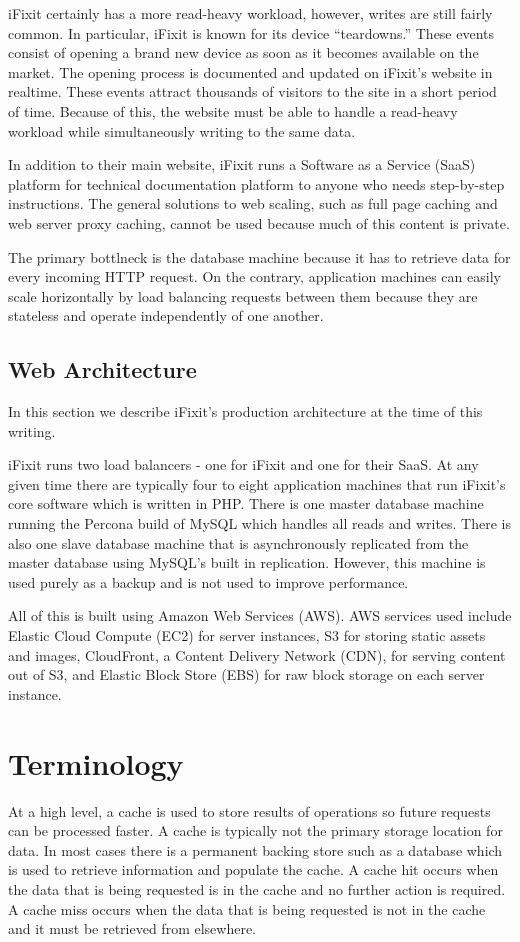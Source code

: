\documentclass[12pt]{ucthesis}
\begin{document}
iFixit certainly has a more read-heavy workload, however, writes are still fairly common.
In particular, iFixit is known for its device ``teardowns.''
These events consist of opening a brand new device as soon as it becomes available on the market.
The opening process is documented and updated on iFixit's website in realtime.
These events attract thousands of visitors to the site in a short period of time.
Because of this, the website must be able to handle a read-heavy workload while simultaneously writing to the same data.

In addition to their main website, iFixit runs a Software as a Service (SaaS) platform for technical documentation platform to anyone who needs step-by-step instructions.
The general solutions to web scaling, such as full page caching and web server proxy caching, cannot be used because much of this content is private.

The primary bottlneck is the database machine because it has to retrieve data for every incoming HTTP request.
On the contrary, application machines can easily scale horizontally by load balancing requests between them because they are stateless and operate independently of one another.

\subsection{Web Architecture}
In this section we describe iFixit's production architecture at the time of this writing.

iFixit runs two load balancers - one for iFixit and one for their SaaS.
At any given time there are typically four to eight application machines that run iFixit's core software which is written in PHP.
There is one master database machine running the Percona build of MySQL which handles all reads and writes.
There is also one slave database machine that is asynchronously replicated from the master database using MySQL's built in replication.
However, this machine is used purely as a backup and is not used to improve performance.

All of this is built using Amazon Web Services (AWS).
AWS services used include Elastic Cloud Compute (EC2) for server instances, S3 for storing static assets and images, CloudFront, a Content Delivery Network (CDN), for serving content out of S3, and Elastic Block Store (EBS) for raw block storage on each server instance.

\section{Terminology}
At a high level, a cache is used to store results of operations so future requests can be processed faster.
A cache is typically not the primary storage location for data.
In most cases there is a permanent backing store such as a database which is used to retrieve information and populate the cache.
A cache hit occurs when the data that is being requested is in the cache and no further action is required.
A cache miss occurs when the data that is being requested is not in the cache and it must be retrieved from elsewhere.
\end{document}
